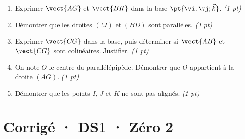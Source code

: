 \begin{enumerate}

\item Exprimer $\vect{AG}$ et $\vect{BH}$ dans la base $\pt{\vi;\vj;\vec k}$. \hfill\textit{(1 pt)}

\item Démontrer que les droites $(IJ)$ et $(BD)$ sont parallèles. \hfill\textit{(1 pt)}

\item Exprimer $\vect{CG}$ dans la base, puis déterminer si $\vect{AB}$ et $\vect{CG}$ sont colinéaires. Justifier. \hfill\textit{(1 pt)}

\item On note $O$ le centre du parallélépipède. Démontrer que $O$ appartient à la droite $(AG)$. \hfill\textit{(1 pt)}

\item Démontrer que les points $I$, $J$ et $K$ ne sont pas alignés. \hfill\textit{(1 pt)}

\end{enumerate}

\ifmxteacher\mxnewpage

\section*{Corrigé · DS1 · Zéro 2}\label{cor:1-2}

